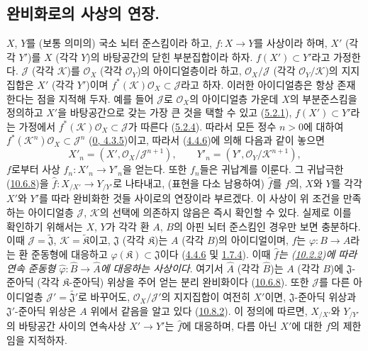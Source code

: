 \subsection{완비화로의 사상의 연장.}
\label{subsection:I.10.9-ko}

\begin{env}[10.9.1]
\label{I.10.9.1-ko}
$X$, $Y$를 (보통 의미의) 국소 뇌터 준스킴이라 하고, $f:X\to Y$를
사상이라 하며, $X'$ (각각 $Y'$)를 $X$ (각각 $Y$)의 바탕공간의 닫힌
부분집합이라 하자. $f(X')\subset Y'$라고 가정한다. $\mathscr{J}$
(각각 $\mathscr{K}$)를 $\mathscr{O}_X$ (각각 $\mathscr{O}_Y$)의
아이디얼층이라 하고, $\mathscr{O}_X/\mathscr{J}$ (각각
$\mathscr{O}_Y/\mathscr{K}$)의 지지집합은 $X'$ (각각 $Y'$)이며
$f^*(\mathscr{K})\mathscr{O}_X\subset\mathscr{J}$라고 하자. 이러한
아이디얼층은 항상 존재한다는 점을 지적해 두자. 예를 들어 $\mathscr{J}$로
$\mathscr{O}_X$의 아이디얼층 가운데 $X$의 부분준스킴을 정의하고
$X'$을 바탕공간으로 갖는 가장 큰 것을 택할 수 있고
(\hyperref[I.5.2.1-ko]{5.2.1}),
$f(X')\subset Y'$라는 가정에서
$f^*(\mathscr{K})\mathscr{O}_X\subset\mathscr{J}$가 따른다
(\hyperref[I.5.2.4-ko]{5.2.4}). 따라서 모든 정수 $n>0$에 대하여
$f^*(\mathscr{K}^n)\mathscr{O}_X\subset\mathscr{J}^n$
(\hyperref[0.4.3.5-ko]{0, 4.3.5})이고, 따라서
(\hyperref[I.4.4.6-ko]{4.4.6})에 의해 다음과 같이 놓으면
\[
  X'_n=(X',\mathscr{O}_X/\mathscr{J}^{n+1}),\qquad
  Y'_n=(Y',\mathscr{O}_Y/\mathscr{K}^{n+1}),
\]
$f$로부터 사상 $f_n:X'_n\to Y'_n$을 얻는다. 또한 $f_n$들은
귀납계를 이룬다. 그 귀납극한
(\hyperref[I.10.6.8-ko]{10.6.8})을
$\widehat f:X_{/X'}\to Y_{/Y'}$로 나타내고, (표현을 다소 남용하여)
$\widehat f$를 $f$의, $X$와 $Y$를 각각 $X'$와 $Y'$를 따라 완비화한
것들 사이로의 연장이라 부르겠다. 이 사상이 위 조건을
만족하는 아이디얼층 $\mathscr{J}$, $\mathscr{K}$의 선택에 의존하지
않음은 즉시 확인할 수 있다. 실제로 이를 확인하기 위해서는 $X$, $Y$가
각각 환 $A$, $B$의 아핀 뇌터 준스킴인 경우만 보면 충분하다. 이때
$\mathscr{J}=\widetilde{\mathfrak{J}}$,
$\mathscr{K}=\widetilde{\mathfrak{K}}$이고, $\mathfrak{J}$ (각각
$\mathfrak{K}$)는 $A$ (각각 $B$)의 아이디얼이며, $f$는
$\varphi:B\to A$라는 환 준동형에 대응하고
$\varphi(\mathfrak{K})\subset\mathfrak{J}$이다
(\hyperref[I.4.4.6-ko]{4.4.6} 및
\hyperref[I.1.7.4-ko]{1.7.4}). 이때
\emph{$\widehat f$는 (\hyperref[I.10.2.2-ko]{10.2.2})에 따라 연속
준동형 $\widehat\varphi:\widehat B\to\widehat A$에 대응하는
사상이다}. 여기서 $\widehat A$ (각각 $\widehat B$)는 $A$ (각각
$B$)에 $\mathfrak{J}$-준아딕 (각각 $\mathfrak{K}$-준아딕) 위상을
주어 얻는 분리 완비화이다
(\hyperref[I.10.6.8-ko]{10.6.8}). 또한
$\mathscr{J}$를 다른
아이디얼층 $\mathscr{J}'=\widetilde{\mathfrak{J}'}$로 바꾸어도,
$\mathscr{O}_X/\mathscr{J}'$의 지지집합이 여전히 $X'$이면,
$\mathfrak{J}$-준아딕 위상과 $\mathfrak{J}'$-준아딕 위상은 $A$ 위에서
같음을 알고 있다
(\hyperref[I.10.8.2-ko]{10.8.2}).
이 정의에 따르면, $X_{/X'}$와 $Y_{/Y'}$의 바탕공간 사이의
연속사상 $X'\to Y'$는 $\widehat f$에 대응하며, 다름 아닌 $X'$에 대한
$f$의 제한임을 지적하자.
\end{env}

